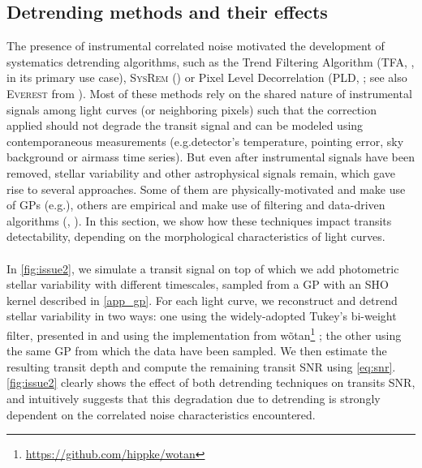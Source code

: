 \documentclass[modern]{aastex631}
\begin{document}
\subsection{Detrending methods and their effects}\label{detrending_effect}
The presence of instrumental correlated noise motivated the development of systematics detrending algorithms, such as the Trend Filtering Algorithm (\textsc{TFA}, \citealt{tfa}, in its primary use case), \textsc{SysRem} (\citealt{sysrem}) or Pixel Level Decorrelation (\textsc{PLD}, \citealt{pld}; see also \textsc{Everest} from \citealt{everest1, everest2}). Most of these methods rely on the shared nature of instrumental signals among light curves (or neighboring pixels) such that the correction applied should not degrade the transit signal and can be modeled using contemporaneous measurements (e.g.\;detector's temperature, pointing error, sky background or airmass time series). But even after instrumental signals have been removed, stellar variability and other astrophysical signals remain, which gave rise to several approaches. Some of them are physically-motivated and make use of GPs (e.g.\;\citealt{k2sc}), others are empirical and make use of filtering and data-driven algorithms (\citealt{Jenkins2010}, \citealt{wotan}). In this section, we show how these techniques impact transits detectability, depending on the morphological characteristics of light curves.\\\\
In \autoref{fig:issue2}, we simulate a transit signal on top of which we add photometric stellar variability with different timescales, sampled from a GP with an SHO kernel described in \autoref{app_gp}. For each light curve, we reconstruct and detrend stellar variability in two ways: one using the widely-adopted Tukey's bi-weight filter, presented in \cite{tukey} and using the implementation from \textsf{wõtan}\footnote{\href{https://github.com/hippke/wotan}{https://github.com/hippke/wotan}} \citep{wotan}; the other using the same GP from which the data have been sampled. We then estimate the resulting transit depth and compute the remaining transit SNR using \autoref{eq:snr}. \autoref{fig:issue2} clearly shows the effect of both detrending techniques on transits SNR, and intuitively suggests that this degradation due to detrending is strongly dependent on the correlated noise characteristics encountered.
\end{document}
